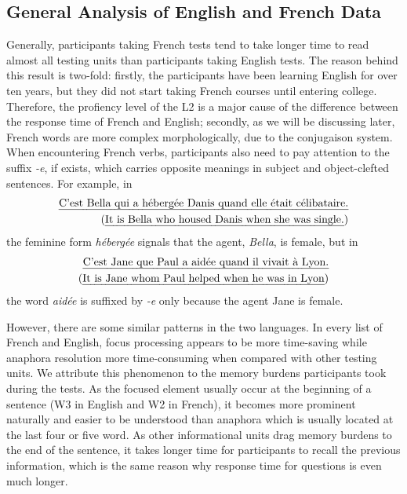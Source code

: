 \subsection{General Analysis of English and French Data}
Generally, participants taking French tests tend to take longer time to read almost all testing units than participants taking English tests. The reason behind this result is two-fold: firstly, the participants have been learning English for over ten years, but they did not start taking French courses until entering college. Therefore, the profiency level of the L2 is a major cause of the difference between the response time of French and English; secondly, as we will be discussing later, French words are more complex morphologically, due to the conjugaison system. When encountering French verbs, participants also need to pay attention to the suffix \emph{-e}, if exists, which carries opposite meanings in subject and object-clefted sentences. For example, in 
\begin{align}
    \mbox{\emph{C'est Bella qui a hébergée Danis quand elle était célibataire.}}\\
    \label{bella}  
    \mbox{(\emph{It is Bella who housed Danis when she was single.})} \notag
\end{align}
the feminine form \emph{hébergée} signals that the agent, \emph{Bella}, is female, but in
\begin{align}
    \mbox{\emph{C'est Jane que Paul a aidée quand il vivait à Lyon.}}\\
    \mbox{(\emph{It is Jane whom Paul helped when he was in Lyon})} \notag
\end{align}
the word \emph{aidée} is suffixed by \emph{-e} only because the agent Jane is female.


However, there are some similar patterns in the two languages. In every list of French and English, focus processing appears to be more time-saving while anaphora resolution more time-consuming when compared with other testing units. We attribute this phenomenon to the memory burdens participants took during the tests. As the focused element usually occur at the beginning of a sentence (W3 in English and W2 in French), it becomes more prominent naturally and easier to be understood than anaphora which is usually located at the last four or five word. As other informational units drag memory burdens to the end of the sentence, it takes longer time for participants to recall the previous information, which is the same reason why response time for questions is even much longer. 

